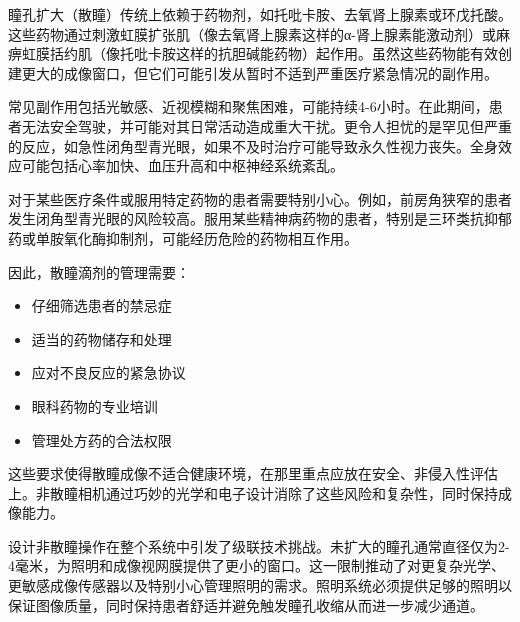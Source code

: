 \documentclass[
  Letterpaper,
]{scrbook}
\providecommand{\tightlist}{%
  \setlength{\itemsep}{0pt}\setlength{\parskip}{0pt}}\usepackage{longtable,booktabs,array}
\begin{document}
\begin{tcolorbox}[enhanced jigsaw, arc=.35mm, breakable, colbacktitle=quarto-callout-note-color!10!white, colback=white, toprule=.15mm, opacityback=0, left=2mm, titlerule=0mm, colframe=quarto-callout-note-color-frame, bottomrule=.15mm, toptitle=1mm, bottomtitle=1mm, rightrule=.15mm, leftrule=.75mm, coltitle=black, title=\textcolor{quarto-callout-note-color}{\faInfo}\hspace{0.5em}{为什么非散瞳操作至关重要？}, opacitybacktitle=0.6]

瞳孔扩大（散瞳）传统上依赖于药物剂，如托吡卡胺、去氧肾上腺素或环戊托酸。这些药物通过刺激虹膜扩张肌（像去氧肾上腺素这样的α-肾上腺素能激动剂）或麻痹虹膜括约肌（像托吡卡胺这样的抗胆碱能药物）起作用。虽然这些药物能有效创建更大的成像窗口，但它们可能引发从暂时不适到严重医疗紧急情况的副作用。\newline{}

常见副作用包括光敏感、近视模糊和聚焦困难，可能持续4-6小时。在此期间，患者无法安全驾驶，并可能对其日常活动造成重大干扰。更令人担忧的是罕见但严重的反应，如急性闭角型青光眼，如果不及时治疗可能导致永久性视力丧失。全身效应可能包括心率加快、血压升高和中枢神经系统紊乱。\newline{}

对于某些医疗条件或服用特定药物的患者需要特别小心。例如，前房角狭窄的患者发生闭角型青光眼的风险较高。服用某些精神病药物的患者，特别是三环类抗抑郁药或单胺氧化酶抑制剂，可能经历危险的药物相互作用。\newline{}

因此，散瞳滴剂的管理需要：

\begin{itemize}
\tightlist
\item
  仔细筛选患者的禁忌症
\item
  适当的药物储存和处理
\item
  应对不良反应的紧急协议
\item
  眼科药物的专业培训
\item
  管理处方药的合法权限
\end{itemize}

这些要求使得散瞳成像不适合健康环境，在那里重点应放在安全、非侵入性评估上。非散瞳相机通过巧妙的光学和电子设计消除了这些风险和复杂性，同时保持成像能力。

\end{tcolorbox}

设计非散瞳操作在整个系统中引发了级联技术挑战。未扩大的瞳孔通常直径仅为2-4毫米，为照明和成像视网膜提供了更小的窗口。这一限制推动了对更复杂光学、更敏感成像传感器以及特别小心管理照明的需求。照明系统必须提供足够的照明以保证图像质量，同时保持患者舒适并避免触发瞳孔收缩从而进一步减少通道。
\end{document}
